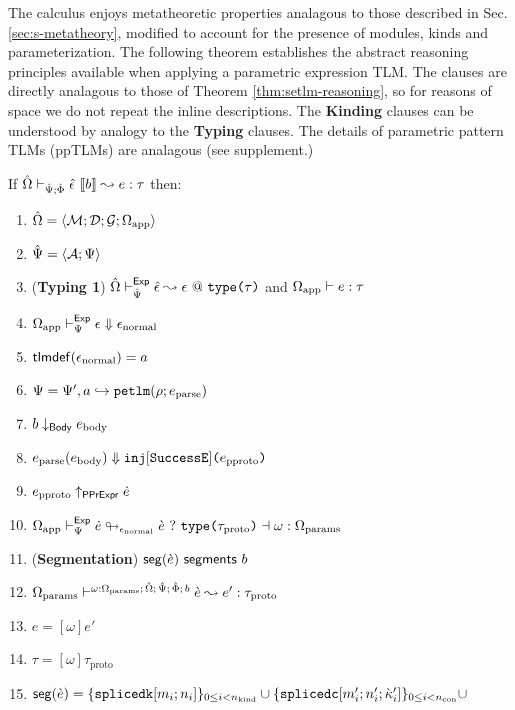 \documentclass[acmsmall,review,anonymous]{acmart}\settopmatter{printfolios=true,printccs=false,printacmref=false}
\begin{document}
The calculus enjoys metatheoretic properties analagous to those described in Sec. \ref{sec:s-metatheory}, modified to account for the presence of modules, kinds and parameterization. The following theorem establishes the abstract reasoning principles available when applying a parametric expression TLM. The clauses are directly analagous to those of Theorem \ref{thm:setlm-reasoning}, so for reasons of space we do not repeat the inline descriptions. The \textbf{Kinding} clauses can be understood by analogy to the \textbf{Typing} clauses. The details of parametric pattern TLMs (ppTLMs) are analagous (see supplement.)
\vspace{-3px}
\begin{theorem}
If ${\hat\Omega} \vdash_{\hat{\Psi}; \hat\Phi} {\hat\epsilon}~\llbracket b\rrbracket \leadsto e : \tau$ then:
\begin{enumerate}
  \item ${\hat\Omega}=\langle \mathcal{M}; \mathcal{D}; \mathcal{G}; \Omega_\text{app} \rangle$
  \item $\hat{\Psi}=\langle \mathcal{A}; \Psi \rangle$
  \item (\textbf{Typing 1}) ${\hat\Omega} \vdash_{\hat{\Psi}}^{\mathsf{Exp}} {\hat\epsilon} \leadsto \epsilon~@~\texttt{type}\texttt{(}\tau\texttt{)}$ and $\Omega_\text{app} \vdash e : \tau$
  \item $\Omega_\text{app} \vdash_{\Psi}^\mathsf{Exp} \epsilon \Downarrow \epsilon_\text{normal}$
  \item $\mathsf{tlmdef}(\epsilon_\text{normal})=a$
  \item $\Psi = \Psi', a \hookrightarrow \texttt{petlm}(\rho; e_\text{parse})$
  \item $b \downarrow_\mathsf{Body} e_\text{body}$
    \item $e_\text{parse}(e_\text{body}) \Downarrow \texttt{inj}[\mathtt{SuccessE}]\texttt{(}e_\text{pproto}\texttt{)}$
  \item $e_\text{pproto} \uparrow_\mathsf{PPrExpr} \dot{e}$
  \item $\Omega_\text{app} \vdash_{\Psi}^\mathsf{Exp} \dot{e} \looparrowright_{\epsilon_\text{normal}} \grave{e} ~?~ \texttt{type}\texttt{(}\tau_\text{proto}\texttt{)} \dashv \omega : \Omega_\text{params}$
  \item (\textbf{Segmentation}) $\mathsf{seg}(\grave{e})~\mathsf{segments}~b$
  \item $\Omega_\text{params} \vdash^{\omega : \Omega_\text{params};\,{\hat\Omega};\,\hat{\Psi};\,\hat\Phi;\,b} \grave{e} \leadsto e' : \tau_\text{proto}$
  \item $e = [\omega]e'$
  \item $\tau = [\omega]\tau_\text{proto}$
  \item $
    \mathsf{seg}(\grave{e}) = \{\texttt{splicedk}[m_i; n_i]\}_{0 \leq i < n_\text{kind}} \cup \{\texttt{splicedc}[m'_i; n'_i; {\grave\kappa}'_i]\}_{0 \leq i < n_\text{con}} \cup $ \\

\end{enumerate}
\end{theorem}
\end{document}
